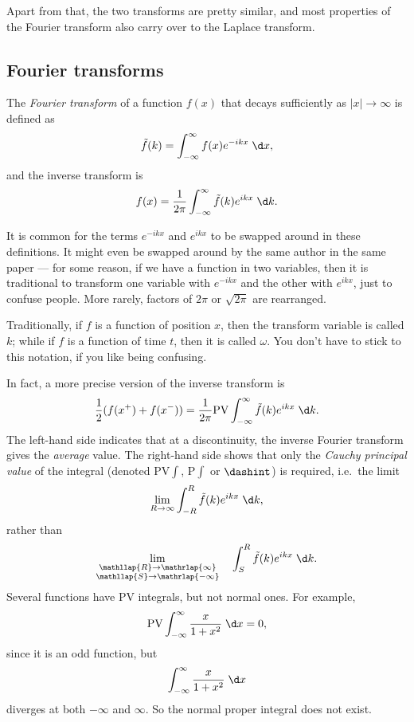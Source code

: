 \documentclass[a4paper]{article}
\begin{document}
Apart from that, the two transforms are pretty similar, and most properties of the Fourier transform also carry over to the Laplace transform.

\subsection{Fourier transforms}
\begin{defi}
  The \emph{Fourier transform} of a function $f(x)$ that decays sufficiently as $|x| \to \infty$ is defined as
  \[
    \tilde{f}(k) = \int_{-\infty}^\infty f(x)e^{-ikx}\;\d x,
  \]
  and the inverse transform is
  \[
    f(x) = \frac{1}{2\pi} \int_{-\infty}^\infty \tilde{f}(k) e^{ikx}\;\d k.
  \]
\end{defi}
It is common for the terms $e^{-ikx}$ and $e^{ikx}$ to be swapped around in these definitions. It might even be swapped around by the same author in the same paper --- for some reason, if we have a function in two variables, then it is traditional to transform one variable with $e^{-ikx}$ and the other with $e^{ikx}$, just to confuse people. More rarely, factors of $2\pi$ or $\sqrt{2\pi}$ are rearranged.

Traditionally, if $f$ is a function of position $x$, then the transform variable is called $k$; while if $f$ is a function of time $t$, then it is called $\omega$. You don't have to stick to this notation, if you like being confusing.

In fact, a more precise version of the inverse transform is
\[
  \frac{1}{2}(f(x^+) + f(x^-)) = \frac{1}{2\pi} \mathrm{PV} \int_{-\infty}^\infty \tilde{f}(k) e^{ikx}\;\d k.
\]
The left-hand side indicates that at a discontinuity, the inverse Fourier transform gives the \emph{average} value. The right-hand side shows that only the \emph{Cauchy principal value} of the integral (denoted $\mathrm{PV} \int$, $\mathrm{P}\int$ or $\dashint$) is required, i.e.\ the limit
\[
  \lim_{R \to \infty} \int_{-R}^R \tilde{f}(k) e^{ikx} \;\d k,
\]
rather than
\[
  \lim_{\substack{\mathllap{R} \to \mathrlap{\infty} \\ \mathllap{S}\to \mathrlap{-\infty}}}\quad \int_S^R\tilde{f}(k) e^{ikx} \;\d k.
\]
Several functions have $\mathrm{PV}$ integrals, but not normal ones. For example,
\[
  \mathrm{PV} \int_{-\infty}^\infty \frac{x}{1 + x^2}\;\d x = 0,
\]
since it is an odd function, but
\[
  \int_{-\infty}^\infty \frac{x}{1 + x^2}\;\d x
\]
diverges at both $-\infty$ and $\infty$. So the normal proper integral does not exist.
\end{document}
